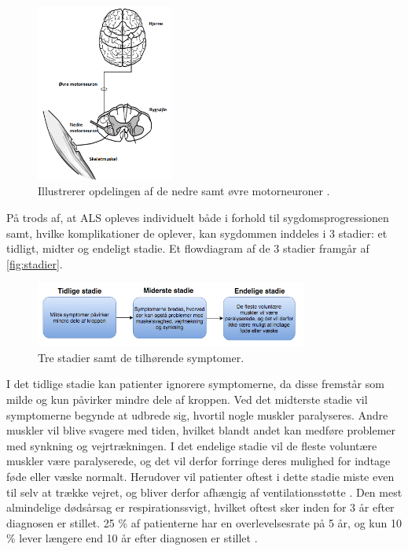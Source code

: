 \begin{figure}[H]
\centering
\includegraphics[width=0.4\textwidth]{figures/motorneuroner.png}
\caption{Illustrerer opdelingen af de nedre samt øvre motorneuroner \citep{miller2005}.}
\label{fig:motorneuroner}
\end{figure}

På trods af, at ALS opleves individuelt både i forhold til sygdomsprogressionen samt, hvilke komplikationer de oplever, kan sygdommen inddeles i 3 stadier: et tidligt, midter og endeligt stadie. Et flowdiagram af de 3 stadier framgår af \autoref{fig:stadier}.

\begin{figure}[H]
\centering
\includegraphics[width=0.8\textwidth]{figures/stadier.png}
\caption{Tre stadier samt de tilhørende symptomer.}
\label{fig:stadier}
\end{figure}

I det tidlige stadie kan patienter ignorere symptomerne, da disse fremstår som milde og kun påvirker mindre dele af kroppen. 
Ved det midterste stadie vil symptomerne begynde at udbrede sig, hvortil nogle muskler paralyseres. Andre muskler vil blive svagere med tiden, hvilket blandt andet kan medføre problemer med synkning og vejrtrækningen. I det endelige stadie vil de fleste voluntære muskler være paralyserede, og det vil derfor forringe deres mulighed for indtage føde eller væske normalt. Herudover vil patienter oftest i dette stadie miste even til selv at trække vejret, og bliver derfor afhængig af ventilationsstøtte \citep{themusculardystrophyassociation2016}.
Den mest almindelige dødsårsag er respirationssvigt, hvilket oftest sker inden for 3 år efter diagnosen er stillet. 25 \% af patienterne har en overlevelsesrate på 5 år, og kun 10 \% lever længere end 10 år efter diagnosen er stillet \citep{grehl2011, miller2005}.




